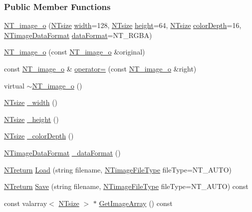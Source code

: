 \subsubsection*{Public Member Functions}
\begin{DoxyCompactItemize}
\item 
\hyperlink{class_n_t__image__o_a196ce9d04d3fe69ea860e04c227ce18f}{NT\_\-image\_\-o} (\hyperlink{nt__types_8h_a06c124f2e4469769b58230253ce0560b}{NTsize} \hyperlink{class_n_t__image__o_af1a2f06cb8db6d36520e72df08c133d0}{width}=128, \hyperlink{nt__types_8h_a06c124f2e4469769b58230253ce0560b}{NTsize} \hyperlink{class_n_t__image__o_a025b7e7250470e53dbf69ba10c013284}{height}=64, \hyperlink{nt__types_8h_a06c124f2e4469769b58230253ce0560b}{NTsize} \hyperlink{class_n_t__image__o_ae4d50a45ce73f956ba47f493ecadb611}{colorDepth}=16, \hyperlink{nt__codes_8h_ad1bb9d54b61901f8e764e6cf0694e52f}{NTimageDataFormat} \hyperlink{class_n_t__image__o_ab497908a0ca93b8a0ab6dc927fa7679c}{dataFormat}=NT\_\-RGBA)
\item 
\hyperlink{class_n_t__image__o_acf5fb298d9584acacb2a7dfec05c67b9}{NT\_\-image\_\-o} (const \hyperlink{class_n_t__image__o}{NT\_\-image\_\-o} \&original)
\item 
const \hyperlink{class_n_t__image__o}{NT\_\-image\_\-o} \& \hyperlink{class_n_t__image__o_a04e364c74e50e8b421a0da0a4f91a436}{operator=} (const \hyperlink{class_n_t__image__o}{NT\_\-image\_\-o} \&right)
\item 
virtual \hyperlink{class_n_t__image__o_a6db4fc0dbf1e2aaad0596f24ceb1902f}{$\sim$NT\_\-image\_\-o} ()
\item 
\hyperlink{nt__types_8h_a06c124f2e4469769b58230253ce0560b}{NTsize} \hyperlink{class_n_t__image__o_a926d1636ce507d000599421b422f545d}{\_\-width} ()
\item 
\hyperlink{nt__types_8h_a06c124f2e4469769b58230253ce0560b}{NTsize} \hyperlink{class_n_t__image__o_a0763a5d4918ea851683361db0d5e33c2}{\_\-height} ()
\item 
\hyperlink{nt__types_8h_a06c124f2e4469769b58230253ce0560b}{NTsize} \hyperlink{class_n_t__image__o_aaa93d86f2d829c240b7d3243d759a871}{\_\-colorDepth} ()
\item 
\hyperlink{nt__codes_8h_ad1bb9d54b61901f8e764e6cf0694e52f}{NTimageDataFormat} \hyperlink{class_n_t__image__o_a37101193bb09eb9c4114c126b15369f9}{\_\-dataFormat} ()
\item 
\hyperlink{nt__types_8h_ab9564ee8f091e809d21b8451c6683c53}{NTreturn} \hyperlink{class_n_t__image__o_ac31c030f1fef1c9b0ceaef0dddf22993}{Load} (string filename, \hyperlink{nt__codes_8h_a231ce3e06dce0c0308bfa7c58c1bbcb6}{NTimageFileType} fileType=NT\_\-AUTO)
\item 
\hyperlink{nt__types_8h_ab9564ee8f091e809d21b8451c6683c53}{NTreturn} \hyperlink{class_n_t__image__o_a36cecb0baa10c1ae9efd9b5c0e27e798}{Save} (string filename, \hyperlink{nt__codes_8h_a231ce3e06dce0c0308bfa7c58c1bbcb6}{NTimageFileType} fileType=NT\_\-AUTO) const 
\item 
const valarray$<$ \hyperlink{nt__types_8h_a06c124f2e4469769b58230253ce0560b}{NTsize} $>$ $\ast$ \hyperlink{class_n_t__image__o_a68e16323f8b0dcb08100f75672bc61d8}{GetImageArray} () const 
\end{DoxyCompactItemize}

